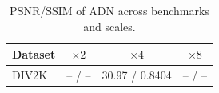 \begin{table}[t]
\centering
\caption{PSNR/SSIM of ADN across benchmarks and scales.}
\label{tab:adn_benchmark}
\begin{tabular}{lccc}
\toprule
Dataset & $\times2$ & $\times4$ & $\times8$ \\
\midrule
DIV2K & -- / -- & 30.97 / 0.8404 & -- / -- \\
\bottomrule
\end{tabular}
\end{table}